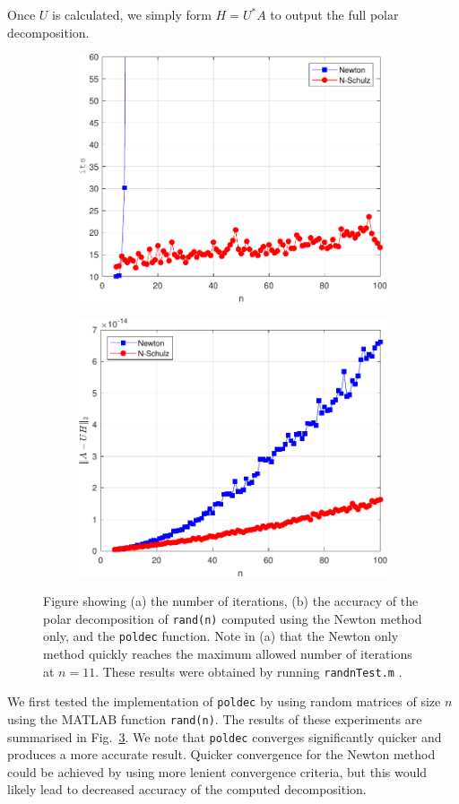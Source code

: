\documentclass[10pt, A4paper]{article}
\begin{document}
Once $U$ is calculated, we simply form $H = U^*A$ to output the full 
polar decomposition.



\begin{figure}[t]
	\centering
	\begin{subfigure}{0.5\textwidth}
		\centering
		\includegraphics[width=.8\linewidth]{randnIts.pdf}
		\caption{\label{fig:randnIts}}
	\end{subfigure}%
	\begin{subfigure}{0.5\textwidth}
		\centering
		\includegraphics[width=.8\linewidth]{randnAccuracy.pdf}
		\caption{\label{fig:randnAccuracy}}
	\end{subfigure}
	\caption{
	Figure showing (a) the number of iterations,
	(b) the accuracy of the polar decomposition of 
	\texttt{rand(n)} computed using the Newton method only, and the 
	\texttt{poldec} function. Note in (a) that the Newton only method 
	quickly reaches the maximum allowed number of iterations at $n = 
	11$. These results were obtained by running \texttt{randnTest.m}
	\label{fig:randn}.}
\end{figure}
We first tested the implementation of \texttt{poldec} by using random 
matrices of size $n$ using the MATLAB function \texttt{rand(n)}. The 
results of these experiments are summarised in Fig.~\ref{fig:randn}.
We note that \texttt{poldec} converges significantly quicker and 
produces a more accurate result.
Quicker convergence for the Newton method could be achieved by using 
more lenient convergence criteria, but this would likely lead 
to decreased accuracy of the computed decomposition.
\end{document}
